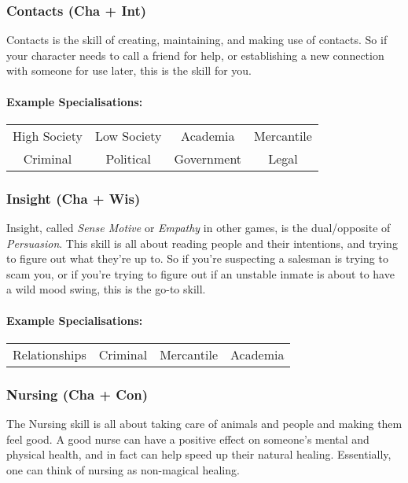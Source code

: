 \subsubsection{Contacts (Cha + Int)}
Contacts is the skill of creating, maintaining, and making use of contacts.
So if your character needs to call a friend for help, or establishing a new connection with someone for use later, this is the skill for you.

\paragraph{Example Specialisations:}
\begin{center}
    \begin{tabular}{c|c|c|c}
        High Society & Low Society & Academia & Mercantile \\
        Criminal & Political & Government & Legal \\
    \end{tabular}
\end{center}

\subsubsection{Insight (Cha + Wis)}
Insight, called \textit{Sense Motive} or \textit{Empathy} in other games, is the dual/opposite of \textit{Persuasion}. 
This skill is all about reading people and their intentions, and trying to figure out what they're up to.
So if you're suspecting a salesman is trying to scam you, or if you're trying to figure out if an unstable inmate is about to have a wild mood swing, this is the go-to skill.

\paragraph{Example Specialisations:}
\begin{center}
    \begin{tabular}{c|c|c|c}
        Relationships & Criminal & Mercantile & Academia \\
    \end{tabular}
\end{center}

\subsubsection{Nursing (Cha + Con)}
The Nursing skill is all about taking care of animals and people and making them feel good.
A good nurse can have a positive effect on someone's mental and physical health, and in fact can help speed up their natural healing.
Essentially, one can think of nursing as non-magical healing.

